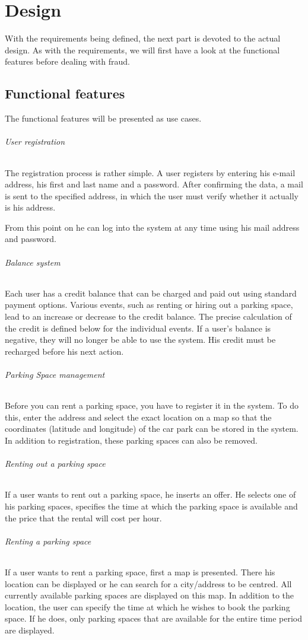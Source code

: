 \chapter{Design}
\label{ch:Design}
With the requirements being defined, the next part is devoted to the actual design. As with the requirements, we will first have a look at the functional features before dealing with fraud.

\section{Functional features}
The functional features will be presented as use cases.
\subparagraph{User registration} The registration process is rather simple. A user registers by entering his e-mail address, his first and last name and a password. After confirming the data, a mail is sent to the specified address, in which the user must verify whether it actually is his address.

From this point on he can log into the system at any time using his mail address and password.

\subparagraph{Balance system} Each user has a credit balance that can be charged and paid out using standard payment options. Various events, such as renting or hiring out a parking space, lead to an increase or decrease to the credit balance. The precise calculation of the credit is defined below for the individual events. If a user's balance is negative, they will no longer be able to use the system. His credit must be recharged before his next action.

\subparagraph{Parking Space management} Before you can rent a parking space, you have to register it in the system. To do this, enter the address and select the exact location on a map so that the coordinates (latitude and longitude) of the car park can be stored in the system. In addition to registration, these parking spaces can also be removed.

\subparagraph{Renting out a parking space} If a user wants to rent out a parking space, he inserts an offer. He selects one of his parking spaces, specifies the time at which the parking space is available and the price that the rental will cost per hour.

\subparagraph{Renting a parking space} If a user wants to rent a parking space, first a map is presented. There his location can be displayed or he can search for a city/address to be centred. All currently available parking spaces are displayed on this map. In addition to the location, the user can specify the time at which he wishes to book the parking space. If he does, only parking spaces that are available for the entire time period are displayed.

